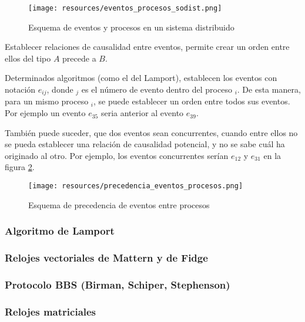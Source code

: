\documentclass[a4paper, 11pt, titlepage]{article}
\begin{document}
        \begin{figure}[htp]
            \centering
            \texttt{[image: resources/eventos\_procesos\_sodist.png]}
            \caption{Esquema de eventos y procesos en un sistema distribuido}
            \label{eventos_procesos_sodist}
        \end{figure}

        Establecer relaciones de causalidad entre eventos, permite crear un orden entre ellos del tipo 
        $A$ precede a $B$.

        Determinados algoritmos (como el del Lamport), establecen los eventos con notación $e_{ij}$, donde $_j$ 
        es el número de evento dentro del proceso $_i$. De esta manera, para un mismo proceso $_i$, se puede 
        establecer un orden entre todos sus eventos. Por ejemplo un evento $e_{35}$ seria anterior al evento 
        $e_{39}$.

        También puede suceder, que dos eventos sean concurrentes, cuando entre ellos no se pueda 
        establecer una relación de causalidad potencial, y no se sabe cuál ha originado al otro. Por 
        ejemplo, los eventos concurrentes serían $e_{12}$ y $e_{31}$ en la figura 
        \ref{precedencia_eventos_procesos}.

        \begin{figure}[htp]
            \centering
            \texttt{[image: resources/precedencia\_eventos\_procesos.png]}
            \caption{Esquema de precedencia de eventos entre procesos}
            \label{precedencia_eventos_procesos}
        \end{figure}

        \subsubsection{Algoritmo de Lamport}

        \subsubsection{Relojes vectoriales de Mattern y de Fidge}

        \subsubsection{Protocolo BBS (Birman, Schiper, Stephenson)}

        \subsubsection{Relojes matriciales}
\end{document}
